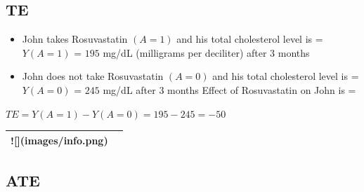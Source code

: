 \documentclass[
]{book}
\providecommand{\tightlist}{%
  \setlength{\itemsep}{0pt}\setlength{\parskip}{0pt}}
\begin{document}
\hypertarget{te}{%
\subsection{TE}\label{te}}

\begin{itemize}
\tightlist
\item
  John takes Rosuvastatin \((A=1)\) and his total cholesterol level is = \(Y(A=1)\) = \(195\) mg/dL (milligrams per deciliter) after 3 months
\item
  John does not take Rosuvastatin \((A=0)\) and his total cholesterol level is = \(Y(A=0)\) = \(245\) mg/dL after 3 months
  Effect of Rosuvastatin on John is =
\end{itemize}

\(TE = Y(A=1) - Y(A=0) = 195 - 245 = - 50\)

\begin{tabular}{l>{}l}
\toprule
![](images/info.png) & \cellcolor[HTML]{3A3B3C}{\textcolor{white}{TE is not estimable as we generally can't observe outcomes under both treatment conditions.}}\\
\bottomrule
\end{tabular}

\hypertarget{ate}{%
\subsection{ATE}\label{ate}}
\end{document}
